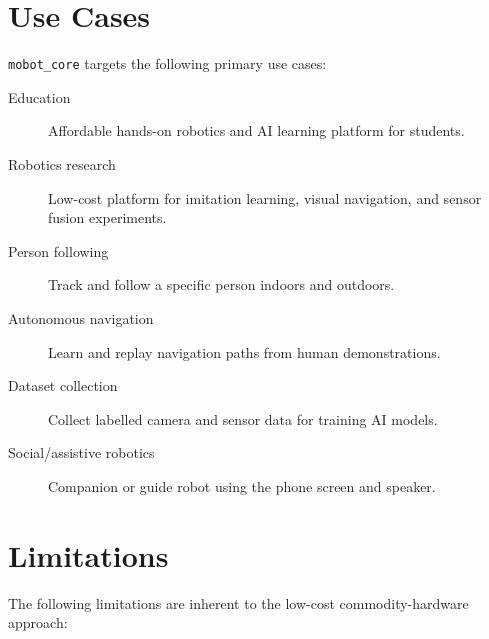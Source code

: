 \documentclass[12pt,a4paper]{article}
\begin{document}
\section{Use Cases}
\label{sec:use_cases}

\texttt{mobot\_core} targets the following primary use cases:

\begin{description}
    \item[Education] Affordable hands-on robotics and AI learning platform for students.
    \item[Robotics research] Low-cost platform for imitation learning, visual navigation, and
          sensor fusion experiments.
    \item[Person following] Track and follow a specific person indoors and outdoors.
    \item[Autonomous navigation] Learn and replay navigation paths from human demonstrations.
    \item[Dataset collection] Collect labelled camera and sensor data for training AI models.
    \item[Social/assistive robotics] Companion or guide robot using the phone screen and speaker.
\end{description}

\section{Limitations}
\label{sec:limitations}

The following limitations are inherent to the low-cost commodity-hardware approach:
\end{document}
